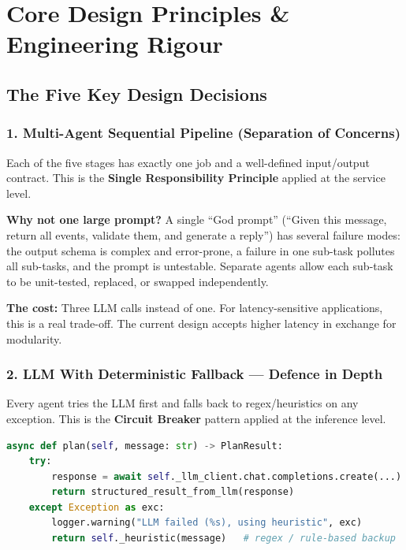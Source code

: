 \documentclass[12pt, a4paper]{article}
\begin{document}
\section{Core Design Principles \& Engineering Rigour}

\subsection{The Five Key Design Decisions}

\subsubsection{1. Multi-Agent Sequential Pipeline (Separation of Concerns)}

Each of the five stages has exactly one job and a well-defined input/output contract. This is the \textbf{Single Responsibility Principle} applied at the service level.

\textbf{Why not one large prompt?} A single ``God prompt'' (``Given this message, return all events, validate them, and generate a reply'') has several failure modes: the output schema is complex and error-prone, a failure in one sub-task pollutes all sub-tasks, and the prompt is untestable. Separate agents allow each sub-task to be unit-tested, replaced, or swapped independently.

\textbf{The cost:} Three LLM calls instead of one. For latency-sensitive applications, this is a real trade-off. The current design accepts higher latency in exchange for modularity.

\subsubsection{2. LLM With Deterministic Fallback — Defence in Depth}

Every agent tries the LLM first and falls back to regex/heuristics on any exception. This is the \textbf{Circuit Breaker} pattern applied at the inference level.

\begin{lstlisting}[language=Python, caption={The fallback pattern -- repeated in all five agents}]
async def plan(self, message: str) -> PlanResult:
    try:
        response = await self._llm_client.chat.completions.create(...)
        return structured_result_from_llm(response)
    except Exception as exc:
        logger.warning("LLM failed (%s), using heuristic", exc)
        return self._heuristic(message)   # regex / rule-based backup
\end{lstlisting}
\end{document}
